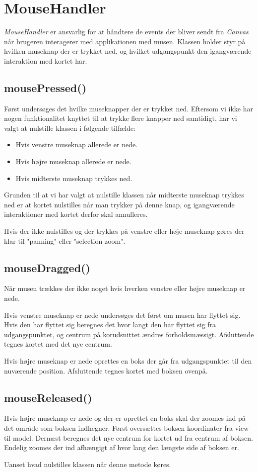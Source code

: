 \section{MouseHandler}

\emph{MouseHandler} er ansvarlig for at håndtere de events der bliver sendt fra \emph{Canvas} når brugeren interagerer med applikationen med musen. Klassen holder styr på hvilken museknap der er trykket ned, og hvilket udgangspunkt den igangværende interaktion med kortet har.

\subsection{mousePressed()}

Først undersøges det hvilke museknapper der er trykket ned. Eftersom vi ikke har nogen funktionalitet knyttet til at trykke flere knapper ned samtidigt, har vi valgt at nulstille klassen i følgende tilfælde:

\begin{itemize}
	\item Hvis venstre museknap allerede er nede.
	\item Hvis højre museknap allerede er nede.
	\item Hvis midterste museknap trykkes ned.
\end{itemize}

Grunden til at vi har valgt at nulstille klassen når midterste museknap trykkes ned er at kortet nulstilles når man trykker på denne knap, og igangværende interaktioner med kortet derfor skal annulleres.

Hvis der ikke nulstilles og der trykkes på venstre eller høje museknap gøres der klar til "panning" eller "selection zoom".

\subsection{mouseDragged()}

Når musen trækkes der ikke noget hvis hverken venstre eller højre museknap er nede.

Hvis venstre museknap er nede undersøges det først om musen har flyttet sig. Hvis den har flyttet sig beregnes det hvor langt den har flyttet sig fra udgangspunktet, og centrum på korudsnittet ændres forholdsmæssigt. Afsluttende tegnes kortet med det nye centrum.

Hvis højre museknap er nede oprettes en boks der går fra udgangspunktet til den nuværende position. Afsluttende tegnes kortet med boksen ovenpå.

\subsection{mouseReleased()}

Hvis højre museknap er nede og der er oprettet en boks skal der zoomes ind på det område som boksen indhegner. Først oversættes boksen koordinater fra view til model. Dernæst beregnes det nye centrum for kortet ud fra centrum af boksen. Endelig zoomes der ind afhængigt af hvor lang den længste side af boksen er.

Uanset hvad nulstilles klassen når denne metode køres.